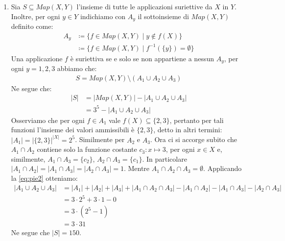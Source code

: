 \begin{enumerate}
	\item Sia $S \subseteq Map(X,Y)$ l'insieme di tutte le applicazioni suriettive da $X$ in $Y$. Inoltre, per ogni $y \in Y$ indichiamo con $A_{y}$ il sottoinsieme di $Map(X,Y)$ definito come:
	\begin{align*}
		A_{y} &\coloneqq \{f \in Map(X,Y) \; | \; y \notin f(X) \}\\
		&\coloneqq \{f \in Map(X,Y) \; | \; f^{-1}(\{y\}) = \emptyset\}
	\end{align*}
	Una applicazione $f$ è suriettiva se e solo se non appartiene a nessun $A_{y}$, per ogni $y=1,2,3$ abbiamo che:
	\begin{align}
		S = Map(X,Y) \setminus (A_{1} \cup A_{2} \cup A_{3})
	\end{align}
	Ne segue che:
	\begin{align*}
		|S| &=  |Map(X,Y)| - |A_{1} \cup A_{2} \cup A_{3}|\\
		&= 3^{5} - |A_{1} \cup A_{2} \cup A_{3}|
	\end{align*}
	Osserviamo che per ogni $f \in A_{1}$ vale $f(X) \subseteq \{2,3\}$, pertanto per tali funzioni l'insieme dei valori ammissibili è $\{2,3\}$, detto in altri termini: $|A_{1}| = |\{2,3\}|^{|X|} = 2^{5}$. Similmente per $A_{2}$ e $A_{3}$. Ora ci si accorge subito che $A_{1} \cap A_{2}$ contiene solo la funzione costante $c_{3}: x \mapsto 3$, per ogni $x \in X$ e, similmente, $A_{1} \cap A_{3} = \{c_{2}\}$, $A_{2} \cap A_{3} = \{c_{1}\}$. In particolare $|A_{1} \cap A_{2}|=|A_{1} \cap A_{3}| = |A_{2} \cap A_{3}| = 1$. Mentre $A_{1} \cap A_{2} \cap A_{3} = \emptyset$. Applicando la \ref{eq:pie2} otteniamo:
	\begin{align*}
		|A_{1} \cup A_{2} \cup A_{3}| &= |A_{1}|+|A_{2}| + |A_{3}| + |A_{1}\cap A_{2} \cap A_{3}| - |A_{1} \cap A_{2}| - |A_{1} \cap A_{3}| - |A_{2} \cap A_{3}| \\
		&= 3 \cdot 2^{5} + 3 \cdot 1 -0\\
		&= 3 \cdot (2^{5}-1)\\
		&= 3 \cdot 31
	\end{align*}
	Ne segue che $|S| = 150$. \hfill \blacksquare
\end{enumerate}
